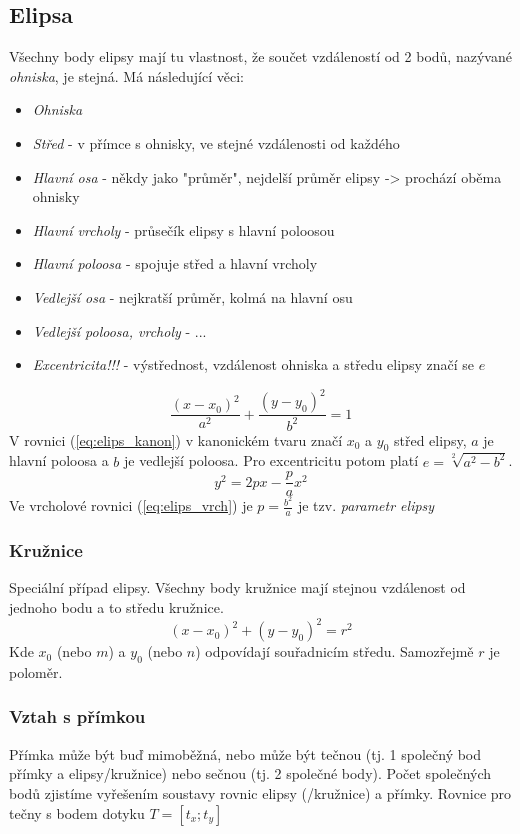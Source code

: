 \documentclass[12pt]{article}
\begin{document}
\subsection{Elipsa}
Všechny body elipsy mají tu vlastnost, že součet vzdáleností od 2 bodů, nazývané \emph{ohniska}, je stejná. Má následující věci:
\begin{itemize}
\item \emph{Ohniska}
\item \emph{Střed} - v přímce s ohnisky, ve stejné vzdálenosti od každého
\item \emph{Hlavní osa} - někdy jako "průměr",  nejdelší průměr elipsy -> prochází oběma ohnisky
\item \emph{Hlavní vrcholy} - průsečík elipsy s hlavní poloosou
\item \emph{Hlavní poloosa} - spojuje střed a hlavní vrcholy
\item \emph{Vedlejší osa} - nejkratší průměr, kolmá na hlavní osu
\item \emph{Vedlejší poloosa, vrcholy} - ...
\item \emph{Excentricita!!!} - výstřednost, vzdálenost ohniska a středu elipsy značí se $e$
\end{itemize}
\begin{equation}
\label{eq:elips_kanon}
\frac{(x-x_0)^2}{a^2} + \frac{(y-y_0)^2}{b^2} = 1
\end{equation}
V rovnici (\ref{eq:elips_kanon}) v kanonickém tvaru značí $x_0$ a $y_0$ střed elipsy, $a$ je hlavní poloosa a $b$ je vedlejší poloosa. Pro excentricitu potom platí $ e = \sqrt[2]{a^2-b^2}$.\\
\begin{equation}
\label{eq:elips_vrch}
y^2 = 2px - \frac{p}{a}x^2
\end{equation}
Ve vrcholové rovnici (\ref{eq:elips_vrch})  je $p = \frac{b^2}{a}$ je tzv. \emph{parametr elipsy}
\subsubsection{Kružnice}
\label{sec:kuz_kruznice}
Speciální případ elipsy. Všechny body kružnice mají stejnou vzdálenost od jednoho bodu a to středu kružnice.
\begin{equation}
(x-x_0)^2 + (y - y_0)^2 = r^2
\end{equation}
Kde $x_0$ (nebo $m$) a $y_0$ (nebo $n$) odpovídají souřadnicím středu.  Samozřejmě $r$ je poloměr.

\subsubsection{Vztah s přímkou}
Přímka může být buď mimoběžná, nebo může být tečnou (tj. 1 společný bod přímky a elipsy/kružnice) nebo sečnou (tj. 2 společné body). Počet společných bodů zjistíme vyřešením soustavy rovnic elipsy (/kružnice) a přímky. Rovnice pro tečny s bodem dotyku $T = \left[ t_x; t_y\right]$
\end{document}
